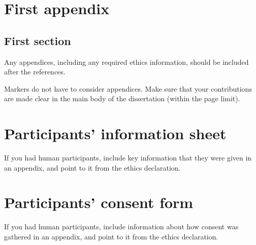 \documentclass[logo,msc,cyber]{infthesis}   %
\begin{document}
\appendix

\chapter{First appendix}

\section{First section}

Any appendices, including any required ethics information, should be included
after the references.

Markers do not have to consider appendices. Make sure that your contributions
are made clear in the main body of the dissertation (within the page limit).

\chapter{Participants' information sheet}

If you had human participants, include key information that they were given in
an appendix, and point to it from the ethics declaration.

\chapter{Participants' consent form}

If you had human participants, include information about how consent was
gathered in an appendix, and point to it from the ethics declaration.
\end{document}
